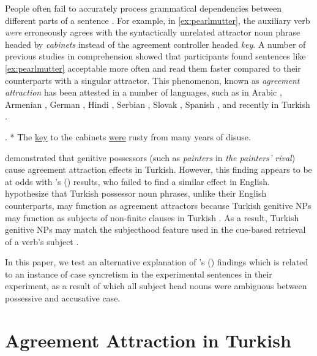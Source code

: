 \documentclass[apacite,linguex]{glossa}\usepackage[]{graphicx}\usepackage[]{color}
\begin{document}
People often fail to accurately process grammatical dependencies between different parts of a sentence \citep[e.g.,][]{GibsonThomas:1999,PhillipsEtAl:2011}. For example, in \ref{ex:pearlmutter}, the auxiliary verb \textit{were} erroneously agrees with the syntactically unrelated attractor noun phrase headed by \textit{cabinets} instead of the agreement controller headed \textit{key}. A number of previous  studies in comprehension \citep{NicolEtAl:1997, PearlmutterGarnseyBock:1999} showed that participants found sentences like \ref{ex:pearlmutter} acceptable more often and read them faster compared to their counterparts with a singular attractor. This phenomenon, known as \textit{agreement attraction} \citep{BockMiller:1991} has been attested in a number of languages, such as in Arabic \citep{TuckerEtAl:2015}, Armenian \citep{AvetisyanEtAl:2020}, German \citep{LagoFelser:2018}, Hindi \citep{BhatiaDillon:2020}, Serbian \citep{RisticEtAl:2016}, Slovak \citep{BadeckerKuminiak:2007}, Spanish \citep{LagoEtAl:2015}, and recently in Turkish \citep{LagoEtAl:2019}.


\ex. \label{ex:pearlmutter} * The \underline{key} to the cabinets \underline{were} rusty from many years of disuse. 


\citet{LagoEtAl:2019} demonstrated that genitive possessors (such as \textit{painters} in \textit{the painters' rival}) cause agreement attraction effects in Turkish. However, this finding appears to be at odds with \citeauthor{NicolEtAl:2016}'s (\citeyear{NicolEtAl:2016}) results, who failed to find a similar effect in English. \citet{LagoEtAl:2019} hypothesize that Turkish possessor noun phrases, unlike their English counterparts, may function as agreement attractors because Turkish genitive NPs may function as subjects of non-finite clauses in Turkish \citep{GokselKerslake:2005,Kornfilt:2011}. As a result, Turkish genitive NPs may match the subjecthood feature used in the cue-based retrieval of a verb's subject \citep{LewisVasishth:2005, ArnettWagers:2017}.

In this paper, we test an alternative explanation of \citeauthor{LagoEtAl:2019}'s (\citeyear{LagoEtAl:2019}) findings which is related to an instance of case syncretism in the experimental sentences in their experiment, as a result of which all subject head nouns were ambiguous between possessive and accusative case.


\section{Agreement Attraction in Turkish}
\end{document}
